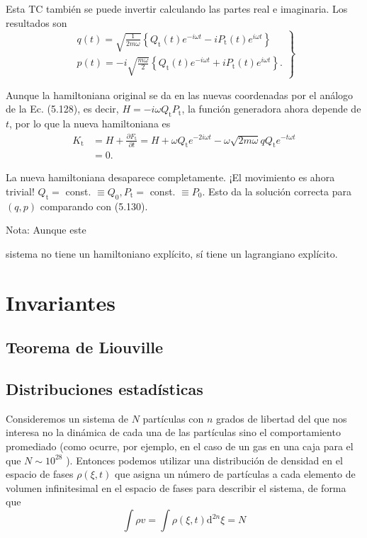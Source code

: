 \begin{example}
Esta TC también se puede invertir calculando las partes real e imaginaria. Los resultados son  
$$
\left.\begin{array}{l}
q(t)=\sqrt{\frac{1}{2 m \omega}}\left\{Q_{\mathrm{t}}(t) e^{-i \omega t}-i P_{\mathrm{t}}(t) e^{i \omega t}\right\}  \tag{5.132}\\
p(t)=-i \sqrt{\frac{m \omega}{2}}\left\{Q_{\mathrm{t}}(t) e^{-i \omega t}+i P_{\mathrm{t}}(t) e^{i \omega t}\right\}.
\end{array}\right\}
$$  

Aunque la hamiltoniana original se da en las nuevas coordenadas por el análogo de la Ec. (5.128), es decir, $H=-i \omega Q_{\mathrm{t}} P_{\mathrm{t}}$, la función generadora ahora depende de $t$, por lo que la nueva hamiltoniana es  
$$
\begin{aligned}
K_{\mathrm{t}} & =H+\frac{\partial F_{\mathrm{t}}}{\partial t}=H+\omega Q_{\mathrm{t}} e^{-2 i \omega t}-\omega \sqrt{2 m \omega} q Q_{\mathrm{t}} e^{-t \omega t} \\
& =0.
\end{aligned}
$$  

La nueva hamiltoniana desaparece completamente. ¡El movimiento es ahora trivial! $Q_{\mathrm{t}}=$ const. $\equiv Q_{0}, P_{\mathrm{t}}=$ const. $\equiv P_{0}$. Esto da la solución correcta para $(q, p)$ comparando con (5.130).  

Nota: Aunque este

 sistema no tiene un hamiltoniano explícito, sí tiene un lagrangiano explícito.
\end{example}
\section{Invariantes}
\subsection{Teorema de Liouville}
\subsection{Distribuciones estadísticas}
Consideremos un sistema de $N$ partículas con $n$ grados de libertad del que nos interesa no la dinámica de cada una de las partículas sino el comportamiento promediado (como ocurre, por ejemplo, en el caso de un gas en una caja para el que $N \sim 10^{28}$ ). Entonces podemos utilizar una distribución de densidad en el espacio de fases $\rho(\xi, t)$ que asigna un número de partículas a cada elemento de volumen infinitesimal en el espacio de fases para describir el sistema, de forma que
$$
\int \rho v=\int \rho(\xi, t) \mathrm{d}^{2 n} \xi=N
$$

